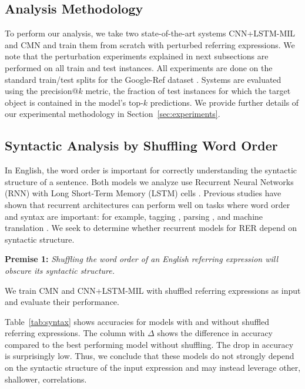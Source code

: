 \documentclass[11pt,a4paper]{article}
\begin{document}
\subsection{Analysis Methodology}\label{ssec:analysis}%
To perform our analysis,
we take two state-of-the-art systems CNN+LSTM-MIL \cite{nagaraja16refexp} and CMN \cite{hu2017modeling} 
and train them from scratch with perturbed referring expressions.
We note that the perturbation experiments explained in next subsections are performed on all train and test instances.
All experiments are done on the standard train/test splits for the Google-Ref dataset \cite{mao2016generation}. Systems are evaluated using the precision@$k$ metric, the fraction of test instances for which the target object is contained in the model's top-$k$ predictions.
We provide further details of our experimental methodology in Section~\ref{sec:experiments}. 

\subsection{Syntactic Analysis by Shuffling Word Order}\label{ssec:syntax}%
In English, the word order is important for correctly understanding the syntactic structure of a sentence.
Both models we analyze use Recurrent Neural Networks (RNN) \cite{elman1990finding} with Long Short-Term Memory (LSTM) cells \cite{hochreiter1997long}.
Previous studies have shown that recurrent architectures can perform well on tasks where word order and syntax are important: for example, tagging \cite{lample2016neural}, parsing \cite{sutskever2014sequence}, and machine translation \cite{bahdanau2014neural}. We seek to determine whether recurrent models for RER depend on syntactic structure.

\noindent\textbf{Premise 1:} \textit{Shuffling the word order of an English referring expression will obscure its syntactic structure.}

\noindent We train CMN and CNN+LSTM-MIL with shuffled referring expressions as input and evaluate their performance.

\tablefive
Table~\ref{tab:syntax} shows accuracies for models with and without shuffled referring expressions.
The column with $\Delta$ shows the difference in accuracy compared to the best performing model without shuffling. 
The drop in accuracy is surprisingly low. 
Thus, we conclude that these models do not strongly depend on the syntactic structure of the input expression and may instead leverage other, shallower, correlations.
\end{document}
